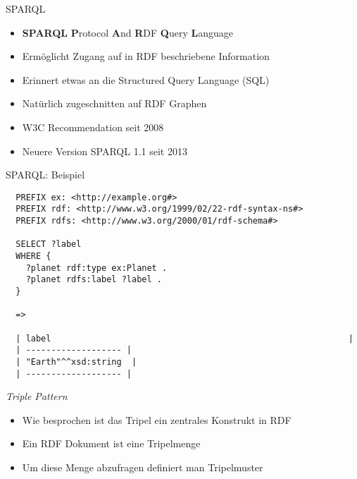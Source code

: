 \documentclass{beamer}
\begin{document}
\begin{frame}{SPARQL}

	\begin{itemize}
		\item \textbf{SPARQL} \textbf{P}rotocol \textbf{A}nd \textbf{R}DF \textbf{Q}uery \textbf{L}anguage
		\item Ermöglicht Zugang auf in RDF beschriebene Information
		\item Erinnert etwas an die Structured Query Language (SQL)
		\item Natürlich zugeschnitten auf RDF Graphen
		\item W3C Recommendation seit 2008
		\item Neuere Version SPARQL 1.1 seit 2013
	\end{itemize}
		
\end{frame}

\begin{frame}[fragile]{SPARQL: Beispiel}
	
	\small
	\begin{lstlisting}
  PREFIX ex: <http://example.org#> 
  PREFIX rdf: <http://www.w3.org/1999/02/22-rdf-syntax-ns#>
  PREFIX rdfs: <http://www.w3.org/2000/01/rdf-schema#>
	
  SELECT ?label
  WHERE {
    ?planet rdf:type ex:Planet .
    ?planet rdfs:label ?label .
  }
  
  =>
  
  | label															|
  | ------------------- |
  | "Earth"^^xsd:string  |
  | ------------------- |
	\end{lstlisting}
	
\end{frame}

\begin{frame}{\emph{Triple Pattern}}
	
	\begin{itemize}
		\item Wie besprochen ist das Tripel ein zentrales Konstrukt in RDF
		\item Ein RDF Dokument ist eine Tripelmenge
		\item Um diese Menge abzufragen definiert man Tripelmuster
	\end{itemize}
	
\end{frame}
\end{document}
